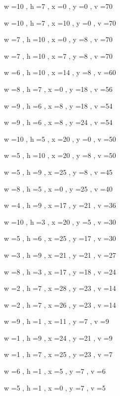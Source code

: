 \documentclass[11pt]{article}
\begin{document}
w =10 , h =7 , x =0 , y =0 , v =70
\par
w =10 , h =7 , x =10 , y =0 , v =70
\par
w =7 , h =10 , x =0 , y =8 , v =70
\par
w =7 , h =10 , x =7 , y =8 , v =70
\par
w =6 , h =10 , x =14 , y =8 , v =60
\par
w =8 , h =7 , x =0 , y =18 , v =56
\par
w =9 , h =6 , x =8 , y =18 , v =54
\par
w =9 , h =6 , x =8 , y =24 , v =54
\par
w =10 , h =5 , x =20 , y =0 , v =50
\par
w =5 , h =10 , x =20 , y =8 , v =50
\par
w =5 , h =9 , x =25 , y =8 , v =45
\par
w =8 , h =5 , x =0 , y =25 , v =40
\par
w =4 , h =9 , x =17 , y =21 , v =36
\par
w =10 , h =3 , x =20 , y =5 , v =30
\par
w =5 , h =6 , x =25 , y =17 , v =30
\par
w =3 , h =9 , x =21 , y =21 , v =27
\par
w =8 , h =3 , x =17 , y =18 , v =24
\par
w =2 , h =7 , x =28 , y =23 , v =14
\par
w =2 , h =7 , x =26 , y =23 , v =14
\par
w =9 , h =1 , x =11 , y =7 , v =9
\par
w =1 , h =9 , x =24 , y =21 , v =9
\par
w =1 , h =7 , x =25 , y =23 , v =7
\par
w =6 , h =1 , x =5 , y =7 , v =6
\par
w =5 , h =1 , x =0 , y =7 , v =5
\par
\newpage
\end{document}
